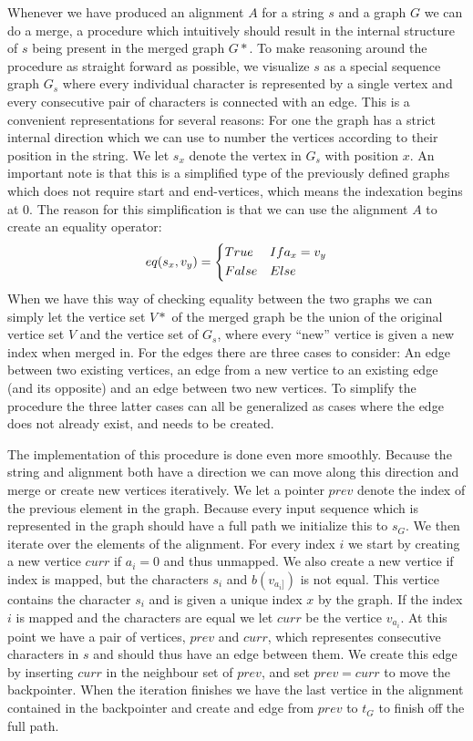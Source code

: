\documentclass[thesis.tex]{subfiles}
\begin{document}
\par\noindent
Whenever we have produced an alignment $A$ for a string $s$ and a graph $G$ we can do a merge, a procedure which intuitively should result in the internal structure of $s$ being present in the merged graph $G*$. To make reasoning around the procedure as straight forward as possible, we visualize $s$ as a special sequence graph $G_s$ where every individual character is represented by a single vertex and every consecutive pair of characters is connected with an edge. This is a convenient representations for several reasons: For one the graph has a strict internal direction which we can use to number the vertices according to their position in the string. We let $s_x$ denote the vertex in $G_s$ with position $x$. An important note is that this is a simplified type of the previously defined graphs which does not require start and end-vertices, which means the indexation begins at 0. 
\clearpage
The reason for this simplification is that we can use the alignment $A$ to create an equality operator:
\begin{equation}
  eq(s_x, v_y) =
  \begin{dcases}
    True & If a_x=v_y\\
    False & Else
  \end{dcases}
\end{equation}
When we have this way of checking equality between the two graphs we can simply let the vertice set $V*$ of the merged graph be the union of the original vertice set $V$ and the vertice set of $G_s$, where every ``new'' vertice is given a new index when merged in. For the edges there are three cases to consider: An edge between two existing vertices, an edge from a new vertice to an existing edge (and its opposite) and an edge between two new vertices. To simplify the procedure the three latter cases can all be generalized as cases where the edge does not already exist, and needs to be created.\\
\par\noindent
The implementation of this procedure is done even more smoothly. Because the string and alignment both have a direction we can move along this direction and merge or create new vertices iteratively. We let a pointer $prev$ denote the index of the previous element in the graph. Because every input sequence which is represented in the graph should have a full path we initialize this to $s_G$. We then iterate over the elements of the alignment. For every index $i$ we start by creating a new vertice $curr$ if $a_i = 0$ and thus unmapped. We also create a new vertice if index is mapped, but the characters $s_i$ and $b(v_{a_i]})$ is not equal. This vertice contains the character $s_i$ and is given a unique index $x$ by the graph. If the index $i$ is mapped and the characters are equal we let $curr$ be the vertice $v_{a_i}$. At this point we have a pair of vertices, $prev$ and $curr$, which representes consecutive characters in $s$ and should thus have an edge between them. We create this edge by inserting $curr$ in the neighbour set of $prev$, and set $prev=curr$ to move the backpointer. When the iteration finishes we have the last vertice in the alignment contained in the backpointer and create and edge from $prev$ to $t_G$ to finish off the full path.\\
\end{document}
